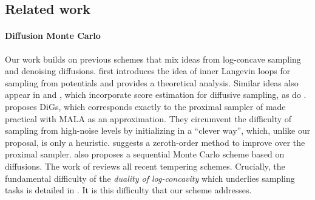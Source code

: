 
\subsection{Related work}

\paragraph{Diffusion Monte Carlo} Our work builds on previous schemes that mix ideas from log-concave sampling and denoising diffusions.
\cite{huang_reverse_2023} first introduces the idea of inner Langevin loops for sampling from potentials and provides a theoretical analysis. Similar ideas also appear in \cite{mcdonald_proposal_2022} and \cite{vargas_denoising_2023}, which incorporate score estimation for diffusive sampling, as do \cite{akhound-sadegh_iterated_2024}. \cite{chen_diffusive_2024} proposes DiGs, which corresponds exactly to the proximal sampler of \cite{shen_composite_2020} made practical with MALA as an approximation. They circumvent the difficulty of sampling from high-noise levels by initializing in a \enquote{clever way}, which, unlike our proposal, is only a heuristic. \cite{he_zeroth-order_2024} suggests a zeroth-order method to improve over the proximal sampler. \cite{phillips_particle_2024} also proposes a sequential Monte Carlo scheme based on diffusions. The work of \cite{chehab_practical_2024} reviews all recent tempering schemes. Crucially, the fundamental difficulty of the \emph{duality of log-concavity} which underlies sampling tasks is detailed in \cite{grenioux_stochastic_2024}. It is this difficulty that our scheme addresses.

